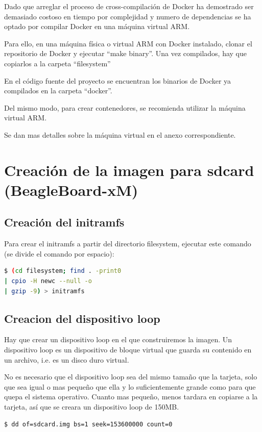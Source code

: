 \documentclass{tfg}
\begin{document}
Dado que arreglar el proceso de cross-compilación de Docker ha demostrado ser demasiado costoso en tiempo por complejidad y numero de dependencias se ha optado por compilar Docker en una máquina virtual ARM.

Para ello, en una máquina física o virtual ARM con Docker instalado, clonar el repositorio de Docker \cite{dockerrepo} y ejecutar ``make binary''. Una vez compilados, hay que copiarlos a la carpeta ``filesystem''

En el código fuente del proyecto se encuentran los binarios de Docker ya compilados en la carpeta ``docker''.

Del mismo modo, para crear contenedores, se recomienda utilizar la máquina virtual ARM.

Se dan mas detalles sobre la máquina virtual en el anexo correspondiente.

\section{Creación de la imagen para sdcard (BeagleBoard-xM)}
\subsection{Creación del initramfs}
Para crear el initramfs a partir del directorio filesystem, ejecutar este comando (se divide el comando por espacio):

\begin{lstlisting}[language=bash,caption=Creacion del initramfs]
$ (cd filesystem; find . -print0
| cpio -H newc --null -o
| gzip -9) > initramfs
\end{lstlisting}
%

\subsection{Creacion del dispositivo loop}
Hay que crear un dispositivo loop en el que construiremos la imagen. Un dispositivo loop es un dispositivo de bloque virtual que guarda su contenido en un archivo, i.e. es un disco duro virtual.

No es necesario que el dispositivo loop sea del mismo tamaño que la tarjeta, solo que sea igual o mas pequeño que ella y lo suficientemente grande como para que quepa el sistema operativo. Cuanto mas pequeño, menos tardara en copiarse a la tarjeta, así que se creara un dispositivo loop de 150MB.

\begin{lstlisting}[language=bash,caption=Creacion del dispositivo loop]
$ dd of=sdcard.img bs=1 seek=153600000 count=0
\end{lstlisting}
\iffalse $ \fi %
\end{document}
